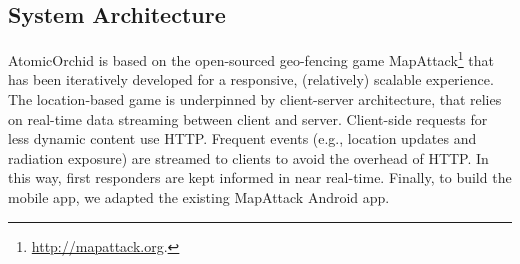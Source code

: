 \subsection{System Architecture}
\noindent AtomicOrchid is based on the open-sourced geo-fencing game MapAttack\footnote{\url{http://mapattack.org}.} that has been iteratively developed for a responsive, (relatively) scalable experience.  The location-based game is underpinned by client-server architecture, that relies on real-time data streaming between client and server. Client-side requests for less dynamic content use HTTP. Frequent events (e.g., location updates and radiation exposure) are streamed to clients to avoid the overhead of HTTP. In this way, first responders are kept informed in near real-time. Finally,  to build the mobile app, we adapted the existing MapAttack Android app.


